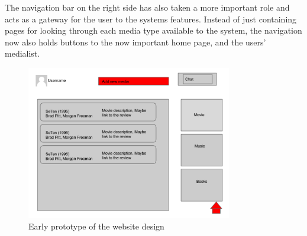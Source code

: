 The navigation bar on the right side has also taken a more important role and acts as a gateway for the user to the systems features. Instead of just containing pages for looking through each media type available to the system, the navigation now also holds buttons to the now important home page, and the users’ medialist.
	
\begin{figure}[htb]
\centering
\includegraphics[width=0.8\textwidth]{Images/OldSite.png}
\caption{Early prototype of the website design}
\label{OldSite}
\end{figure}